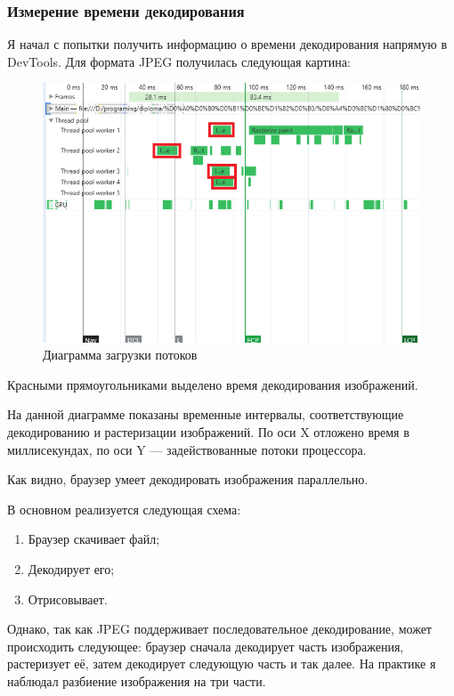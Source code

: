 \documentclass[12pt]{article}
\begin{document}
\subsubsection{Измерение времени декодирования}

Я начал с попытки получить информацию о времени декодирования напрямую
в DevTools. Для формата JPEG получилась следующая картина:

\begin{figure}[H]
    \centering
    \includegraphics[width=1\textwidth]{../images/image_comp/devtools.png}
    \caption{Диаграмма загрузки потоков}
\end{figure}

Красными прямоугольниками выделено время декодирования изображений.

На данной диаграмме показаны временные интервалы, соответствующие декодированию и растеризации изображений.
По оси X отложено время в миллисекундах, по оси Y — задействованные потоки процессора.

Как видно, браузер умеет декодировать изображения параллельно.

В основном реализуется следующая схема:

\begin{enumerate}
    \item Браузер скачивает файл;
    \item Декодирует его;
    \item Отрисовывает.
\end{enumerate}

Однако, так как JPEG поддерживает последовательное декодирование,
может происходить следующее: браузер сначала декодирует часть изображения,
растеризует её, затем декодирует следующую часть и так далее.
На практике я наблюдал разбиение изображения на три части.
\end{document}
